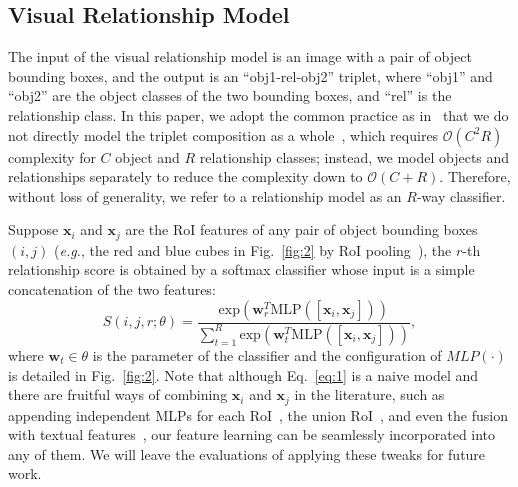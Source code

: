 \documentclass[runningheads]{llncs}
\newcommand{\eg}{\textit{e.g.}}
\begin{document}
\subsection{Visual Relationship Model}
The input of the visual relationship model is an image with a pair of object bounding boxes, and the output is an ``obj1-rel-obj2'' triplet, where ``obj1'' and ``obj2'' are the object classes of the two bounding boxes, and ``rel'' is the relationship class. In this paper, we adopt the common practice as in~\cite{lu2016visual,zhang2017visual} that we do not directly model the triplet composition as a whole~\cite{sadeghi2011recognition,dai2017detecting}, which requires $\mathcal{O}(C^2R)$ complexity for $C$ object and $R$ relationship classes; instead, we model objects and relationships separately to reduce the complexity down to $\mathcal{O}(C+R)$. Therefore, without loss of generality, we refer to a relationship model as an $R$-way classifier. 

Suppose $\mathbf{x}_i$ and $\mathbf{x}_j$ are the RoI features of any pair of object bounding boxes $(i,j)$ (\eg, the red and blue cubes in Fig.~\ref{fig:2} by RoI pooling~\cite{girshick2015fast}), the $r$-th relationship score is obtained by a softmax classifier whose input is a simple concatenation of the two features:
\begin{equation}\label{eq:1}
S(i,j, r;\theta) = \frac{\textrm{exp}\left(\mathbf{w}_r^T\textrm{MLP}([\mathbf{x}_i,\mathbf{x}_j])\right)}{\sum\limits_{t = 1}^{R}\textrm{exp}\left(\mathbf{w}^T_t\textrm{MLP}([\mathbf{x}_i,\mathbf{x}_j])\right)},
\end{equation}
where $\mathbf{w}_t\in\theta$ is the parameter of the classifier and the configuration of $MLP(\cdot)$ is detailed in Fig.~\ref{fig:2}. Note that although Eq.~\eqref{eq:1} is a naive model and there are fruitful ways of combining $\mathbf{x}_i$ and $\mathbf{x}_j$ in the literature, such as appending independent MLPs for each RoI~\cite{zhang2017visual}, the union RoI~\cite{li2017vip}, and even the fusion with textual features~\cite{hu2016modeling}, our feature learning can be seamlessly incorporated into any of them. We will leave the evaluations of applying these tweaks for future work.
\end{document}
